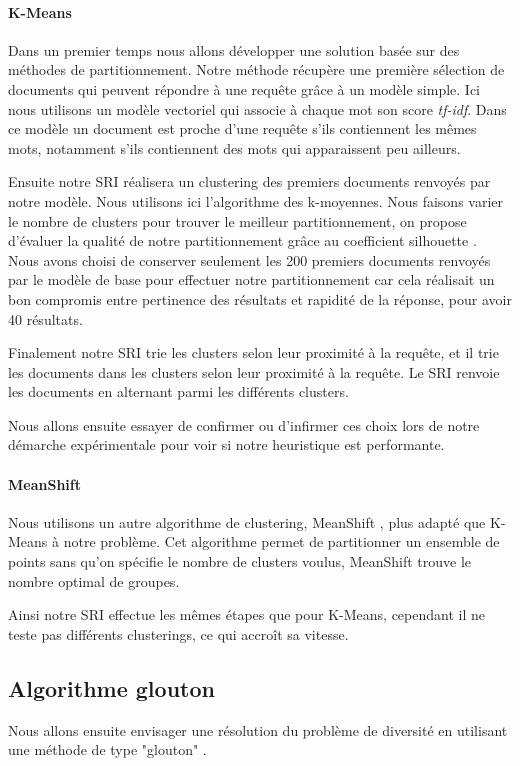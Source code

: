 \documentclass{article}
\begin{document}
\paragraph{K-Means}

Dans un premier temps nous allons développer une solution basée sur des méthodes de partitionnement. Notre méthode récupère une première sélection de documents qui peuvent répondre à une requête grâce à un modèle simple. Ici nous utilisons un modèle vectoriel qui associe à chaque mot son score \textit{tf-idf}. Dans ce modèle un document est proche d'une requête s'ils contiennent les mêmes mots, notamment s'ils contiennent des mots qui apparaissent peu ailleurs.

Ensuite notre SRI réalisera un clustering des premiers documents renvoyés par notre modèle. Nous utilisons ici l'algorithme des k-moyennes. Nous faisons varier le nombre de clusters pour trouver le meilleur partitionnement, on propose d'évaluer la qualité de notre partitionnement grâce au coefficient silhouette \cite{rousseeuw87}. 
Nous avons choisi de conserver seulement les 200 premiers documents renvoyés par le modèle de base pour effectuer notre partitionnement car cela réalisait un bon compromis entre pertinence des résultats et rapidité de la réponse, pour avoir 40 résultats.

Finalement notre SRI trie les clusters selon leur proximité à la requête, et il trie les documents dans les clusters selon leur proximité à la requête. Le SRI renvoie les documents en alternant parmi les différents clusters. 

Nous allons ensuite essayer de confirmer ou d'infirmer ces choix lors de notre démarche expérimentale pour voir si notre heuristique est performante. 

\paragraph{MeanShift}
Nous utilisons un autre algorithme de clustering, MeanShift \cite{fukunuga75}, plus adapté que K-Means à notre problème.
Cet algorithme permet de partitionner un ensemble de points sans qu'on spécifie le nombre de clusters voulus, MeanShift trouve le nombre optimal de groupes.

Ainsi notre SRI effectue les mêmes étapes que pour K-Means, cependant il ne teste pas différents clusterings, ce qui accroît sa vitesse.


\subsection{Algorithme glouton} Nous allons ensuite envisager une résolution du problème de diversité en utilisant une méthode de type "glouton" \cite{zhai03}. \\
\end{document}

